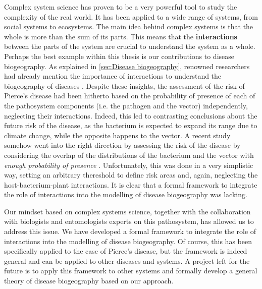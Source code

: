 Complex system science has proven to be a very powerful tool to study the
complexity of the real world. It has been applied to a wide range of systems,
from social systems to ecosystems. The main idea behind complex systems is that
the whole is more than the sum of its parts. This means that the
\textbf{interactions} between the parts of the system are crucial to understand
the system as a whole. Perhaps the best example within this thesis is our
contributions to disease biogeography. As explained in \cref{sec:Disease
    biogeography}, renowned researchers had already mention the importance of
interactions to understand the biogeography of diseases \cite{Peterson2008}.
Despite these insights, the assessment of the risk of Pierce's disease had been
hitherto based on the probability of presence of each of the pathosystem
components (i.e. the pathogen and the vector) independently, neglecting their
interactions. Indeed, this led to contrasting conclusions about the future risk
of the disease, as the bacterium is expected to expand its range due to climate
change, while the opposite happens to the vector. A recent study somehow went
into the right direction by assessing the risk of the disease by considering
the overlap of the distributions of the bacterium and the vector with
\textit{enough probability of presence} \cite{YoonLee2023}. Unfortunately, this
was done in a very simplistic way, setting an arbitrary thereshold to define
risk areas and, again, neglecting the host-bacterium-plant interactions. It is
clear that a formal framework to integrate the role of interactions into the
modelling of disease biogeography was lacking.

Our mindset based on complex systems science, together with the collaboration
with biologists and entomologists experts on this pathosystem, has allowed us
to address this issue. We have developed a formal framework to integrate the
role of interactions into the modelling of disease biogeography. Of course,
this has been specifically applied to the case of Pierce's disease, but the
framework is indeed general and can be applied to other diseases and systems.
A project left for the future is to apply this framework to other systems and
formally develop a general theory of disease biogeography based on our
approach.

